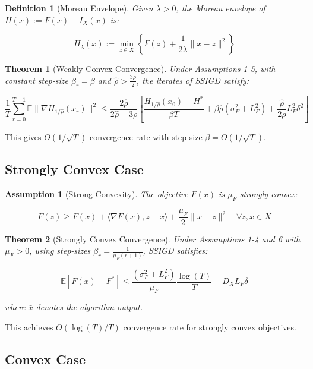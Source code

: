 \documentclass[11pt]{article}
\newtheorem{theorem}{Theorem}
\newtheorem{assumption}{Assumption}
\newtheorem{definition}{Definition}
\begin{document}
\begin{definition}[Moreau Envelope]
Given $\lambda > 0$, the Moreau envelope of $H(x) := F(x) + I_X(x)$ is:

$$
H_\lambda(x) := \min_{z \in X} \left\{ F(z) + \frac{1}{2\lambda}\|x - z\|^2 \right\}
$$

\end{definition}

\begin{theorem}[Weakly Convex Convergence]
Under Assumptions 1-5, with constant step-size $\beta_r = \beta$ and $\hat{\rho} > \frac{3\rho}{2}$, the iterates of SSIGD satisfy:

$$
\frac{1}{T}\sum_{r=0}^{T-1} \mathbb{E}\|\nabla H_{1/\hat{\rho}}(x_r)\|^2 \leq \frac{2\hat{\rho}}{2\hat{\rho} - 3\rho} \left[ \frac{H_{1/\hat{\rho}}(x_0) - H^*}{\beta T} + \beta\hat{\rho}(\sigma_F^2 + L_F^2) + \frac{\hat{\rho}}{2\rho}L_F^2\delta^2 \right]
$$

\end{theorem}

This gives $O(1/\sqrt{T})$ convergence rate with step-size $\beta = O(1/\sqrt{T})$.

\subsection{Strongly Convex Case}

\begin{assumption}[Strong Convexity]
The objective $F(x)$ is $\mu_F$-strongly convex:

$$
F(z) \geq F(x) + \langle\nabla F(x), z - x\rangle + \frac{\mu_F}{2}\|x - z\|^2 \quad \forall z, x \in X
$$

\end{assumption}

\begin{theorem}[Strongly Convex Convergence]
Under Assumptions 1-4 and 6 with $\mu_F > 0$, using step-sizes $\beta_r = \frac{1}{\mu_F(r+1)}$, SSIGD satisfies:

$$
\mathbb{E}[F(\bar{x}) - F^*] \leq \frac{(\sigma_F^2 + L_F^2)}{\mu_F} \frac{\log(T)}{T} + D_X L_F \delta
$$

where $\bar{x}$ denotes the algorithm output.
\end{theorem}

This achieves $O(\log(T)/T)$ convergence rate for strongly convex objectives.

\subsection{Convex Case}
\end{document}
